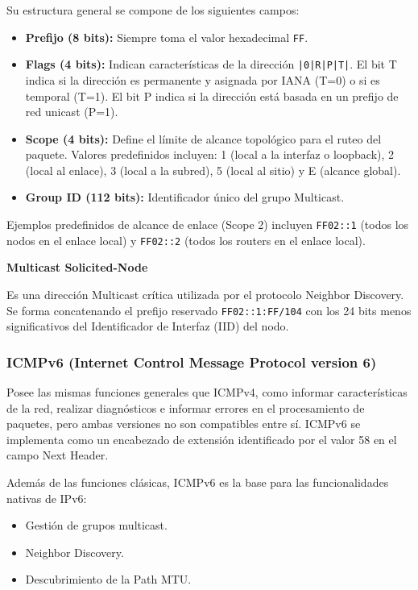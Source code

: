 Su estructura general se compone de los siguientes campos:
\begin{itemize}
    \item \textbf{Prefijo (8 bits):} Siempre toma el valor hexadecimal \texttt{FF}.
    \item \textbf{Flags (4 bits):} Indican características de la dirección \texttt{|0|R|P|T|}. El bit T indica si la dirección es permanente y asignada por IANA (T=0) o si es temporal (T=1). El bit P indica si la dirección está basada en un prefijo de red unicast (P=1).
    \item \textbf{Scope (4 bits):} Define el límite de alcance topológico para el ruteo del paquete. Valores predefinidos incluyen: 1 (local a la interfaz o loopback), 2 (local al enlace), 3 (local a la subred), 5 (local al sitio) y E (alcance global).
    \item \textbf{Group ID (112 bits):} Identificador único del grupo Multicast.
\end{itemize}

Ejemplos predefinidos de alcance de enlace (Scope 2) incluyen \texttt{FF02::1} (todos los nodos en el enlace local) y \texttt{FF02::2} (todos los routers en el enlace local).

\textbf{Multicast Solicited-Node}

Es una dirección Multicast crítica utilizada por el protocolo Neighbor Discovery. Se forma concatenando el prefijo reservado \texttt{FF02::1:FF/104} con los 24 bits menos significativos del Identificador de Interfaz (IID) del nodo.

\subsubsection{ICMPv6 (Internet Control Message Protocol version 6)}

Posee las mismas funciones generales que ICMPv4, como informar características de la red, realizar diagnósticos e informar errores en el procesamiento de paquetes, pero ambas versiones no son compatibles entre sí. ICMPv6 se implementa como un encabezado de extensión identificado por el valor 58 en el campo Next Header.

Además de las funciones clásicas, ICMPv6 es la base para las funcionalidades nativas de IPv6:
\begin{itemize}
  \item Gestión de grupos multicast.
  \item Neighbor Discovery.
  \item Descubrimiento de la Path MTU.
\end{itemize}

